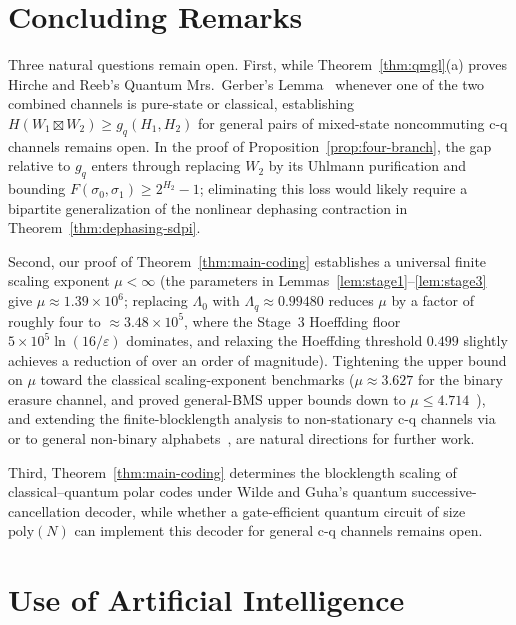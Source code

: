 \documentclass[10pt,a4paper]{article}
\numberwithin{equation}{section}
\theoremstyle{plain}
\theoremstyle{definition}
\theoremstyle{remark}
\begin{document}
\section{Concluding Remarks}\label{sec:concluding}

Three natural questions remain open. First, while Theorem~\ref{thm:qmgl}(a) proves Hirche and Reeb's Quantum Mrs.\ Gerber's Lemma~\cite[Conjecture~VII.1]{HircheReeb2018} whenever one of the two combined channels is pure-state or classical, establishing $H(W_1 \boxtimes W_2) \ge g_q(H_1, H_2)$ for general pairs of mixed-state noncommuting c-q channels remains open. In the proof of Proposition~\ref{prop:four-branch}, the gap relative to $g_q$ enters through replacing $W_2$ by its Uhlmann purification and bounding $F(\sigma_0, \sigma_1) \ge 2^{H_2} - 1$; eliminating this loss would likely require a bipartite generalization of the nonlinear dephasing contraction in Theorem~\ref{thm:dephasing-sdpi}.

Second, our proof of Theorem~\ref{thm:main-coding} establishes a universal finite scaling exponent $\mu < \infty$ (the parameters in Lemmas~\ref{lem:stage1}--\ref{lem:stage3} give $\mu \approx 1.39 \times 10^6$; replacing $\Lambda_0$ with $\Lambda_q \approx 0.99480$ reduces $\mu$ by a factor of roughly four to $\approx 3.48 \times 10^5$, where the Stage~3 Hoeffding floor $5 \times 10^5 \ln(16/\varepsilon)$ dominates, and relaxing the Hoeffding threshold $0.499$ slightly achieves a reduction of over an order of magnitude). Tightening the upper bound on $\mu$ toward the classical scaling-exponent benchmarks ($\mu \approx 3.627$ for the binary erasure channel, and proved general-BMS upper bounds down to $\mu \le 4.714$~\cite{HassaniAlishahiUrbanke2014,GoldinBurshtein2014,GuruswamiXia2015,MondelliHassaniUrbanke2016}), and extending the finite-blocklength analysis to non-stationary c-q channels via~\cite[Lemma~VIII.1]{HircheReeb2018} or to general non-binary alphabets~\cite{NasserRenes2018}, are natural directions for further work.

Third, Theorem~\ref{thm:main-coding} determines the blocklength scaling of classical--quantum polar codes under Wilde and Guha's quantum successive-cancellation decoder, while whether a gate-efficient quantum circuit of size $\mathrm{poly}(N)$ can implement this decoder for general c-q channels remains open.

\section*{Use of Artificial Intelligence}
\end{document}
